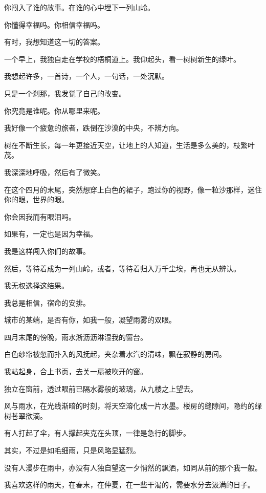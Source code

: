 \documentclass[12pt,a4paper]{article}
\def\blankrev{\vspace{1ex}}									%
\begin{document}
		你闯入了谁的故事。在谁的心中埋下一列山岭。\par
		你懂得幸福吗。你相信幸福吗。\par
		有时，我想知道这一切的答案。\par
		一个早上，我独自走在学校的梧桐道上。我仰起头，看一树树新生的绿叶。\par
		我想起许多，一首诗，一个人，一句话，一处沉默。\par
		只是一个刹那，我发觉了自己的改变。\par
		你究竟是谁呢。你从哪里来呢。\par
		我好像一个疲惫的旅者，跌倒在沙漠的中央，不辨方向。\par
		树在不断生长，每一年更接近天空，让地上的人知道，生活是多么美的，枝繁叶茂。\par
		我深深地呼吸，然后有了微笑。\par
		在这个四月的末尾，突然想穿上白色的裙子，跑过你的视野，像一粒沙那样，迷住你的眼，世界的眼。\par
		你会因我而有眼泪吗。\par
		如果有，一定也是因为幸福。

		我是这样闯入你们的故事。\par
		然后，等待着成为一列山岭，或者，等待着归入万千尘埃，再也无从辨认。\par
		我无权选择这结果。\par
		我总是相信，宿命的安排。

	\endwriting



		城市的某端，是否有你，如我一般，凝望雨雾的双眼。

		\blankrev
		四月末尾的傍晚，雨水淅沥沥淋湿我的窗台。\par
		白色纱帘被忽而扑入的风抚起，夹杂着水汽的清味，飘在寂静的房间。\par
		我站起身，合上书页，去关一扇被吹开的窗。\par
		独立在窗前，透过眼前已隔水雾般的玻璃，从九楼之上望去。\par
		风与雨水，在光线渐暗的时刻，将天空溶化成一片水墨。楼房的缝隙间，隐约的绿树苍翠欲滴。\par
		有人打起了伞，有人撑起夹克在头顶，一律是急行的脚步。\par
		其实，不过是如毛细雨，只是风略显猛烈。\par
		没有人漫步在雨中，亦没有人独自望这一夕悄然的飘洒，如同从前的那个我一般。

		我喜欢这样的雨天，在春末，在仲夏，在一些干渴的，需要水分去汲满的日子。
\end{document}
